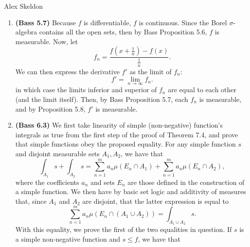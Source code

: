 \documentclass[11pt]{article}
\begin{document}
\nolinebreak \begin{center}  Alex Skeldon \end{center}

\begin{enumerate}
  \item \textbf{(Bass 5.7)} Because $f$ is differentiable, $f$ is continuous. Since the Borel  $\sigma$-algebra contains all the open sets, then by Bass Proposition 5.6, $f$ is measurable.
Now, let \[
f_n = \frac{f(x+\frac{1}{n}) - f(x)}{\frac{1}{n}}
.\]
We can then express the derivative $f'$ as the limit of $f_n$:
\[
f' = \lim_{n \to \infty} f_n
.\] 
in which case the limits inferior and superior of $f_n$ are equal to each other (and the limit itself). Then, by Bass Proposition 5.7, each $f_n$ is measurable, and by Proposition 5.8, $f'$ is measurable.
  \item \textbf{(Bass 6.3)} We first take linearity of simple (non-negative) function's integrals as true from the first step of the proof of Theorem 7.4, and prove that simple functions obey the proposed equality. For any simple function $s$ and disjoint measurable sets $A_1, A_2$, we have that 
\[
  \int_{A_1} s + \int_{A_2}s = \sum_{n=1}^{m} a_n \mu(E_n \cap A_1) + \sum_{n=1}^{m} a_n \mu(E_n \cap A_2)
,\] 
where the coefficients $a_n$ and sets $E_n$ are those defined in the construction of a simple function. We then have by basic set logic and additivity of measures that, since $A_1$ and $A_2$ are disjoint, that the latter expression is equal to
\[
  \sum_{n=1}^{m} a_n \mu(E_n \cap (A_1 \cup A_2)) = \int_{A_1 \cup A_2} s
.\] 
With this equality, we prove the first of the two equalities in question.
\newline \indent If $s$ is a simple non-negative function and $s \le f$, we have that


\end{enumerate}
\end{document}
